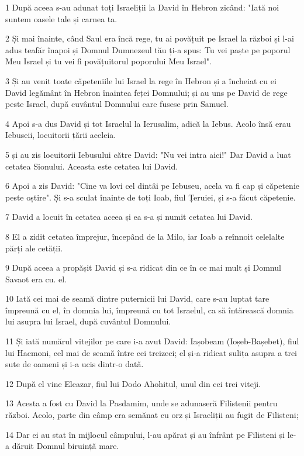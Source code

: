 \par 1 După aceea s-au adunat toți Israeliții la David în Hebron zicând: "Iată noi suntem oasele tale și carnea ta.
\par 2 Și mai înainte, când Saul era încă rege, tu ai povățuit pe Israel la război și l-ai adus teafăr înapoi și Domnul Dumnezeul tău ți-a spus: Tu vei paște pe poporul Meu Israel și tu vei fi povățuitorul poporului Meu Israel".
\par 3 Și au venit toate căpeteniile lui Israel la rege în Hebron și a încheiat cu ei David legământ în Hebron înaintea feței Domnului; și au uns pe David de rege peste Israel, după cuvântul Domnului care fusese prin Samuel.
\par 4 Apoi s-a dus David și tot Israelul la Ierusalim, adică la Iebus. Acolo însă erau Iebuseii, locuitorii țării aceleia.
\par 5 și au zis locuitorii Iebusului către David: "Nu vei intra aici!" Dar David a luat cetatea Sionului. Aceasta este cetatea lui David.
\par 6 Apoi a zis David: "Cine va lovi cel dintâi pe Iebuseu, acela va fi cap și căpetenie peste oștire". Și s-a sculat înainte de toți Ioab, fiul Țeruiei, și s-a făcut căpetenie.
\par 7 David a locuit în cetatea aceea și ea s-a și numit cetatea lui David.
\par 8 El a zidit cetatea împrejur, începând de la Milo, iar Ioab a reînnoit celelalte părți ale cetății.
\par 9 După aceea a propășit David și s-a ridicat din ce în ce mai mult și Domnul Savaot era cu. el.
\par 10 Iată cei mai de seamă dintre puternicii lui David, care s-au luptat tare împreună cu el, în domnia lui, împreună cu tot Israelul, ca să întărească domnia lui asupra lui Israel, după cuvântul Domnului.
\par 11 Și iată numărul vitejilor pe care i-a avut David: Iașobeam (Ioșeb-Bașebet), fiul lui Hacmoni, cel mai de seamă între cei treizeci; el și-a ridicat sulița asupra a trei sute de oameni și i-a ucis dintr-o dată.
\par 12 După el vine Eleazar, fiul lui Dodo Ahohitul, unul din cei trei viteji.
\par 13 Acesta a fost cu David la Pasdamim, unde se adunaseră Filistenii pentru război. Acolo, parte din câmp era semănat cu orz și Israeliții au fugit de Filisteni;
\par 14 Dar ei au stat în mijlocul câmpului, l-au apărat și au înfrânt pe Filisteni și le-a dăruit Domnul biruință mare.
